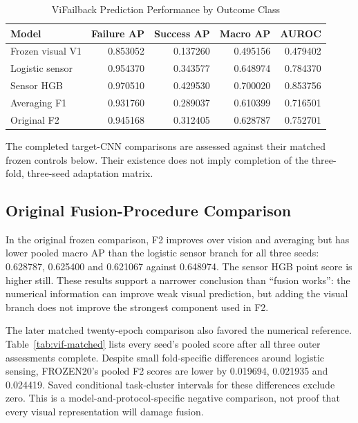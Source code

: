 \begin{table}[htbp]
\caption{ViFailback Prediction Performance by Outcome Class}\label{tab:vif-bothclass}
\centering\small

\begin{tabular}{lrrrr}\hline Model&Failure AP&Success AP&Macro AP&AUROC\\\hline
Frozen visual V1&0.853052&0.137260&0.495156&0.479402\\
Logistic sensor&0.954370&0.343577&0.648974&0.784370\\
Sensor HGB&0.970510&0.429530&0.700020&0.853756\\
Averaging F1&0.931760&0.289037&0.610399&0.716501\\
Original F2&0.945168&0.312405&0.628787&0.752701\\\hline
\end{tabular}
\end{table}

The completed target-CNN comparisons are assessed against their matched frozen controls below. Their existence does not imply completion of the three-fold, three-seed adaptation matrix.

\subsection{Original Fusion-Procedure Comparison}
In the original frozen comparison, F2 improves over vision and averaging but has lower pooled macro AP than the logistic sensor branch for all three seeds: 0.628787, 0.625400 and 0.621067 against 0.648974. The sensor HGB point score is higher still. These results support a narrower conclusion than ``fusion works'': the numerical information can improve weak visual prediction, but adding the visual branch does not improve the strongest component used in F2.

The later matched twenty-epoch comparison also favored the numerical reference. Table~\ref{tab:vif-matched} lists every seed's pooled score after all three outer assessments complete. Despite small fold-specific differences around logistic sensing, FROZEN20's pooled F2 scores are lower by 0.019694, 0.021935 and 0.024419. Saved conditional task-cluster intervals for these differences exclude zero. This is a model-and-protocol-specific negative comparison, not proof that every visual representation will damage fusion.

